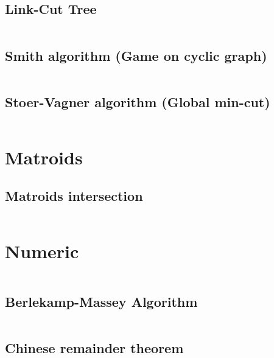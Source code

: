 \documentclass{article}
\begin{document}
\subsection{Link-Cut Tree}
\inputminted[mathescape, breaklines, breakafter=(, tabsize=2, frame=lines, showtabs, tab=|\ , tabcolor=lightgray]{c++}{./graphs/link-cut-tree/link-cut-tree.cpp}
\subsection{Smith algorithm (Game on cyclic graph)}
\inputminted[mathescape, breaklines, breakafter=(, tabsize=2, frame=lines, showtabs, tab=|\ , tabcolor=lightgray]{c++}{./graphs/smith/smith.cpp}
\subsection{Stoer-Vagner algorithm (Global min-cut)}
\inputminted[mathescape, breaklines, breakafter=(, tabsize=2, frame=lines, showtabs, tab=|\ , tabcolor=lightgray]{c++}{./graphs/stoer-vagner/stoer-vagner.cpp}
\section{Matroids}
\subsection{Matroids intersection}
\inputminted[mathescape, breaklines, breakafter=(, tabsize=2, frame=lines, showtabs, tab=|\ , tabcolor=lightgray]{c++}{./matroids/matroids-intersection/matroids-intersection.cpp}
\section{Numeric}
\inputminted[mathescape, breaklines, breakafter=(, tabsize=2, frame=lines, showtabs, tab=|\ , tabcolor=lightgray]{c++}{./numeric/mod-ineq-first-sol.cpp}
\subsection{Berlekamp-Massey Algorithm}
\inputminted[mathescape, breaklines, breakafter=(, tabsize=2, frame=lines, showtabs, tab=|\ , tabcolor=lightgray]{c++}{./numeric/berlekamp/berlekamp.cpp}
\subsection{Chinese remainder theorem}
\inputminted[mathescape, breaklines, breakafter=(, tabsize=2, frame=lines, showtabs, tab=|\ , tabcolor=lightgray]{c++}{./numeric/chinese-remainder-theorem/chinese-remainder-theorem.cpp}
\end{document}
